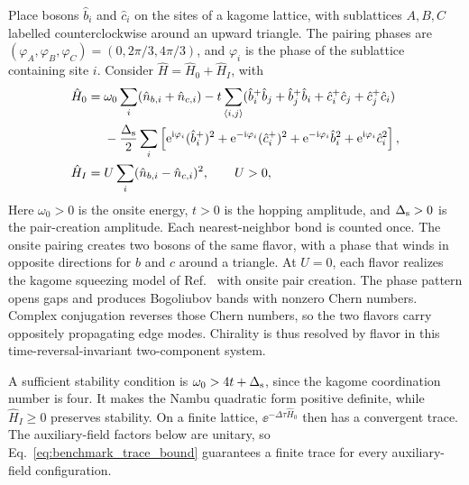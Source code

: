 Place bosons $\hat b_i$ and $\hat c_i$ on the sites of a kagome lattice, with sublattices $A,B,C$ labelled counterclockwise around an upward triangle. The pairing phases are $(\varphi_A,\varphi_B,\varphi_C)=(0,2\pi/3,4\pi/3)$, and $\varphi_i$ is the phase of the sublattice containing site $i$. Consider $\hat H=\hat H_0+\hat H_I$, with
\begin{align}
    \hat H_0={}&\omega_0\sum_i(\hat n_{b,i}+\hat n_{c,i})
       -t\sum_{\langle i,j\rangle}
       (\hat b_i^+\hat b_j+\hat b_j^+\hat b_i
        +\hat c_i^+\hat c_j+\hat c_j^+\hat c_i)\notag\\
       &-\frac{\Delta_{\rm s}}{2}\sum_i\left[
         \mathrm{e}^{\mathrm{i}\varphi_i}(\hat b_i^+)^2
        +\mathrm{e}^{-\mathrm{i}\varphi_i}(\hat c_i^+)^2
        +\mathrm{e}^{-\mathrm{i}\varphi_i}\hat b_i^2
        +\mathrm{e}^{\mathrm{i}\varphi_i}\hat c_i^2\right],
    \label{eq:trs_conjugate_BdG_H0}\\
    \hat H_I={}&U\sum_i(\hat n_{b,i}-\hat n_{c,i})^2,
    \qquad U>0,
    \label{eq:trs_conjugate_BdG_HI}
\end{align}
Here $\omega_0>0$ is the onsite energy, $t>0$ is the hopping amplitude, and $\Delta_{\rm s}>0$ is the pair-creation amplitude. Each nearest-neighbor bond is counted once. The onsite pairing creates two bosons of the same flavor, with a phase that winds in opposite directions for $b$ and $c$ around a triangle. At $U=0$, each flavor realizes the kagome squeezing model of Ref.~\cite{peanoHoudeBrendel2016squeezing} with onsite pair creation. The phase pattern opens gaps and produces Bogoliubov bands with nonzero Chern numbers. Complex conjugation reverses those Chern numbers, so the two flavors carry oppositely propagating edge modes. Chirality is thus resolved by flavor in this time-reversal-invariant two-component system.

A sufficient stability condition is $\omega_0>4t+\Delta_{\rm s}$, since the kagome coordination number is four. It makes the Nambu quadratic form positive definite, while $\hat H_I\ge0$ preserves stability. On a finite lattice, $\ee^{-\Delta\tau\hat H_0}$ then has a convergent trace. The auxiliary-field factors below are unitary, so Eq.~\eqref{eq:benchmark_trace_bound} guarantees a finite trace for every auxiliary-field configuration.

